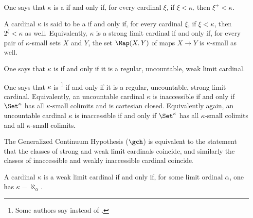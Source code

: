 \begin{definition}
	One says that $ \kappa $ is a  if and only if,
	for every cardinal $ \xi $,
	if $ \xi < \kappa $, then $ \xi^+ < \kappa $.

	A cardinal $\kappa$ is said to be a  if and only if,
	for every cardinal $ \xi $,
	if $ \xi < \kappa $, then $ 2^{\xi} < \kappa $ as well.
	Equivalently, $ \kappa $ is a strong limit cardinal if and only if,
	for every pair of $ \kappa $-small sets $ X $ and $ Y $,
	the set $ \Map(X, Y) $ of maps $ X \to Y $ is $ \kappa $-small as well. 

	One says that $\kappa$ is  if and only if
	it is a regular, uncountable, weak limit cardinal.

	One says that $\kappa$ is %
	\footnote{Some authors say 
	instead of .}
	if and only if it is a regular, uncountable, strong limit cardinal.
	Equivalently, an uncountable cardinal $ \kappa $ is inaccessible if and only if
	$ \Set^{\kappa} $ has all $ \kappa $-small colimits and is cartesian closed.
	Equivalently again, an uncountable cardinal $ \kappa $ is inaccessible if and only if 
	$ \Set^{\kappa} $ has all $ \kappa $-small colimits and all $ \kappa $-small colimits.
\end{definition}

The Generalized Continuum Hypothesis ($ \gch $) is equivalent to the statement that
the classes of strong and weak limit cardinals coincide,
and similarly the classes of inaccessible and weakly inaccessible cardinal coincide.

\begin{eg}
	A cardinal $ \kappa $ is a weak limit cardinal if and only if,
	for some limit ordinal $ \alpha $, one has $ \kappa = \aleph_{\alpha} $.
\end{eg}


